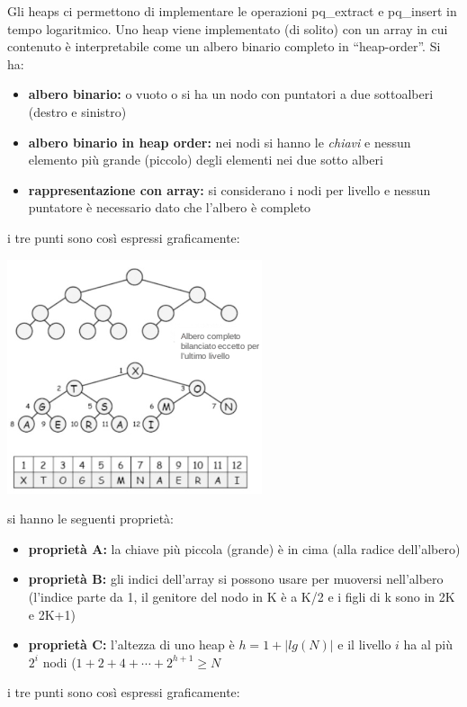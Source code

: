 \documentclass[a4paper,12pt, oneside]{book}
\begin{document}
Gli heaps ci permettono di implementare le operazioni pq\_extract e pq\_insert
in tempo logaritmico. Uno heap viene implementato (di solito) con un array in cui contenuto è
interpretabile come un albero binario completo in “heap-order”. Si ha:
\begin{itemize}
\item \textbf{albero binario:} o vuoto o si ha un nodo con puntatori a due sottoalberi
(destro e sinistro)
\item \textbf{albero binario in heap order:} nei nodi si hanno le \textit{chiavi} e nessun elemento più grande (piccolo)
degli elementi nei due sotto alberi
\item \textbf{rappresentazione con array:} si considerano i nodi per livello e nessun puntatore è necessario dato
che l’albero è completo
\end{itemize}
i tre punti sono così espressi graficamente:
\begin{center}
\includegraphics[scale=3]{img/c7.png}
\end{center}
si hanno le seguenti proprietà:
\begin{itemize}
\item \textbf{proprietà A:} la chiave più piccola
(grande) è in cima (alla radice
dell’albero)
\item \textbf{proprietà B:} gli indici dell’array si
possono usare per muoversi
nell’albero (l'indice parte da 1, il genitore del nodo in K è a K/2 e i figli di k sono in 2K e 2K+1)
\item \textbf{proprietà C:} l’altezza di uno heap è $h=1+|lg(N)|$ e il livello $i$ ha al più $2^i$ nodi ($1+2+4+\cdots+2^{h+1}\geq N$
\end{itemize}
i tre punti sono così espressi graficamente:
\end{document}
